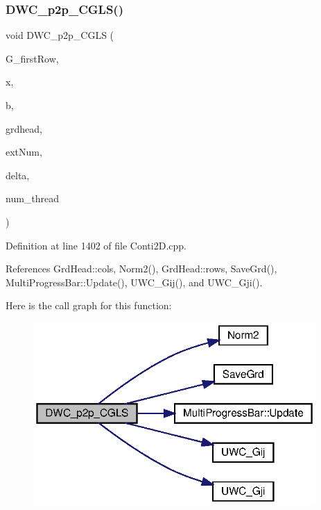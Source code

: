 \subsubsection{D\+W\+C\+\_\+p2p\+\_\+\+C\+G\+L\+S()}
{\footnotesize\ttfamily void D\+W\+C\+\_\+p2p\+\_\+\+C\+G\+LS (\begin{DoxyParamCaption}\item[{double $\ast$}]{G\+\_\+first\+Row,  }\item[{double $\ast$}]{x,  }\item[{double $\ast$}]{b,  }\item[{\textbf{ Grd\+Head}}]{grdhead,  }\item[{int}]{ext\+Num,  }\item[{double}]{delta,  }\item[{int}]{num\+\_\+thread }\end{DoxyParamCaption})}



Definition at line 1402 of file Conti2\+D.\+cpp.



References Grd\+Head\+::cols, Norm2(), Grd\+Head\+::rows, Save\+Grd(), Multi\+Progress\+Bar\+::\+Update(), U\+W\+C\+\_\+\+Gij(), and U\+W\+C\+\_\+\+Gji().

Here is the call graph for this function\+:
\nopagebreak
\begin{figure}[H]
\begin{center}
\leavevmode
\includegraphics[width=305pt]{Conti2D_8h_a68e9e4a8817a29dce16c782fa8213faa_a68e9e4a8817a29dce16c782fa8213faa_cgraph}
\end{center}
\end{figure}
\mbox{\label{Conti2D_8h_afb187c363388d28caa8a055176269f12_afb187c363388d28caa8a055176269f12}} 
